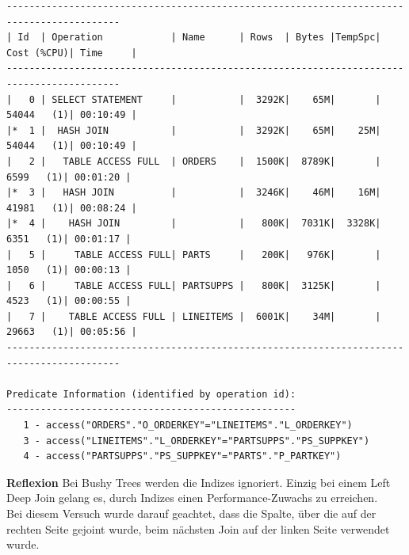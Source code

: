 \documentclass[10pt]{article}
\begin{document}
\begin{lstlisting}[style=queryexecutionplan]
------------------------------------------------------------------------------------------
| Id  | Operation            | Name      | Rows  | Bytes |TempSpc| Cost (%CPU)| Time     |
------------------------------------------------------------------------------------------
|   0 | SELECT STATEMENT     |           |  3292K|    65M|       | 54044   (1)| 00:10:49 |
|*  1 |  HASH JOIN           |           |  3292K|    65M|    25M| 54044   (1)| 00:10:49 |
|   2 |   TABLE ACCESS FULL  | ORDERS    |  1500K|  8789K|       |  6599   (1)| 00:01:20 |
|*  3 |   HASH JOIN          |           |  3246K|    46M|    16M| 41981   (1)| 00:08:24 |
|*  4 |    HASH JOIN         |           |   800K|  7031K|  3328K|  6351   (1)| 00:01:17 |
|   5 |     TABLE ACCESS FULL| PARTS     |   200K|   976K|       |  1050   (1)| 00:00:13 |
|   6 |     TABLE ACCESS FULL| PARTSUPPS |   800K|  3125K|       |  4523   (1)| 00:00:55 |
|   7 |    TABLE ACCESS FULL | LINEITEMS |  6001K|    34M|       | 29663   (1)| 00:05:56 |
------------------------------------------------------------------------------------------
 
Predicate Information (identified by operation id):
---------------------------------------------------
   1 - access("ORDERS"."O_ORDERKEY"="LINEITEMS"."L_ORDERKEY")
   3 - access("LINEITEMS"."L_ORDERKEY"="PARTSUPPS"."PS_SUPPKEY")
   4 - access("PARTSUPPS"."PS_SUPPKEY"="PARTS"."P_PARTKEY")
\end{lstlisting}
\textbf{Reflexion} \newline
Bei Bushy Trees werden die Indizes ignoriert. Einzig bei einem Left Deep Join gelang es, durch Indizes einen Performance-Zuwachs zu erreichen.\\
Bei diesem Versuch wurde darauf geachtet, dass die Spalte, über die auf der rechten Seite gejoint wurde, beim nächsten Join auf der linken Seite verwendet wurde.
\end{document}

